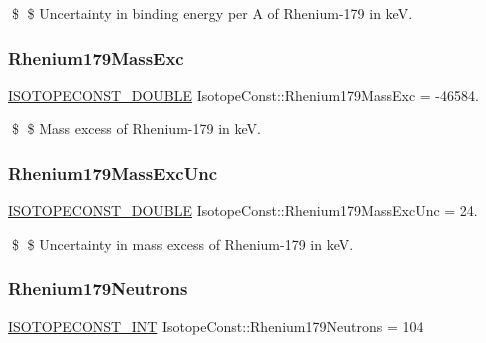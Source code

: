 \$ \$ Uncertainty in binding energy per A of Rhenium-\/179 in keV. \mbox{\label{group___isotope_const-_rhenium-_re179_gab4f14c8e6447aaa19950f7ad3a257d9d}} 
\subsubsection{\texorpdfstring{Rhenium179\+Mass\+Exc}{Rhenium179MassExc}}
{\footnotesize\ttfamily \mbox{\hyperlink{group___isotope_const-_macros_ga8f45a7272ce02c0b4c65c44636ed719a}{I\+S\+O\+T\+O\+P\+E\+C\+O\+N\+S\+T\+\_\+\+D\+O\+U\+B\+LE}} Isotope\+Const\+::\+Rhenium179\+Mass\+Exc = -\/46584.}

\$ \$ Mass excess of Rhenium-\/179 in keV. \mbox{\label{group___isotope_const-_rhenium-_re179_ga424be4178a1efe570c4e8745e9e95d35}} 
\subsubsection{\texorpdfstring{Rhenium179\+Mass\+Exc\+Unc}{Rhenium179MassExcUnc}}
{\footnotesize\ttfamily \mbox{\hyperlink{group___isotope_const-_macros_ga8f45a7272ce02c0b4c65c44636ed719a}{I\+S\+O\+T\+O\+P\+E\+C\+O\+N\+S\+T\+\_\+\+D\+O\+U\+B\+LE}} Isotope\+Const\+::\+Rhenium179\+Mass\+Exc\+Unc = 24.}

\$ \$ Uncertainty in mass excess of Rhenium-\/179 in keV. \mbox{\label{group___isotope_const-_rhenium-_re179_gae0d06c2c188c6e7875120db19db86bb2}} 
\subsubsection{\texorpdfstring{Rhenium179\+Neutrons}{Rhenium179Neutrons}}
{\footnotesize\ttfamily \mbox{\hyperlink{group___isotope_const-_macros_ga5f18360b3e99483a35c32d789e62621c}{I\+S\+O\+T\+O\+P\+E\+C\+O\+N\+S\+T\+\_\+\+I\+NT}} Isotope\+Const\+::\+Rhenium179\+Neutrons = 104}

